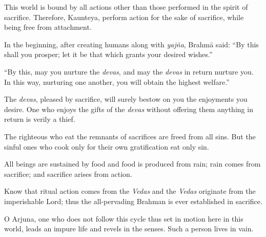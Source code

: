 {This world is bound by all actions other than those performed in the spirit of sacrifice. Therefore, Kaunteya, perform action for the sake of sacrifice, while being free from attachment.}

{In the beginning, after creating humans along with \textit{yajña}, Brahmā said: \enquote{By this shall you prosper; let it be that which grants your desired wishes.}}

{\enquote{By this, may you nurture the \textit{devas}, and may the \textit{devas} in return nurture you. In this way, nurturing one another, you will obtain the highest welfare.}}

{The \textit{devas}, pleased by sacrifice, will surely bestow on you the enjoyments you desire. One who enjoys the gifts of the \textit{devas} without offering them anything in return is verily a thief.}

{The righteous who eat the remnants of sacrifices are freed from all sins. But the sinful ones who cook only for their own gratification eat only sin.}

{All beings are sustained by food and food is produced from rain; rain comes from sacrifice; and sacrifice arises from action.}

{Know that ritual action comes from the \textit{Vedas} and the \textit{Vedas} originate from the imperishable Lord; thus the all-pervading Brahman is ever established in sacrifice.}

{O Arjuna, one who does not follow this cycle thus set in motion here in this world, leads an impure life and revels in the senses. Such a person lives in vain.}

